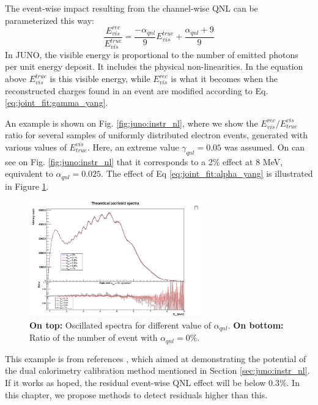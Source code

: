 \documentclass[../main.tex]{subfiles}
\begin{document}
The event-wise impact resulting from the channel-wise QNL can be parameterized this way:
\begin{equation}
  \label{eq:joint_fit:alpha_yang}
  \frac{E^{rec}_{vis}}{E^{true}_{vis}} = \frac{-\alpha_{qnl}}{9} E^{true}_{vis} + \frac{\alpha_{qnl} + 9}{9}
\end{equation}
In JUNO, the visible energy is proportional to the number of emitted photons per unit energy deposit. It includes the physical non-linearities.
In the equation above $E_{vis}^{true}$ is this visible energy, while $E_{vis}^{rec}$ is what it becomes when the reconstructed charges found in an event are modified according to Eq. \ref{eq:joint_fit:gamma_yang}.

An example is shown on Fig. \ref{fig:juno:instr_nl}, where we show the $E^{rec}_{vis}/E_{true}^{vis}$ ratio for several samples of uniformly distributed electron events, generated with various values of $E_{true}^{vis}$.
Here, an extreme value $\gamma_{qnl}=0.05$ was assumed. On can see on Fig. \ref{fig:juno:instr_nl} that it corresponds to a 2\% effect at 8 MeV, equivalent to $\alpha_{qnl} = 0.025$. The effect of Eq \ref{eq:joint_fit:alpha_yang} is illustrated in Figure \ref{fig:joint_fit:spectrums_comp}.

\begin{figure}[ht]
  \centering
  \includegraphics[height=5cm]{images/joint_fit/spectrums.png}
  \caption{\textbf{On top:} Oscillated spectra for different value of $\alpha_{qnl}$. \textbf{On bottom:} Ratio of the number of event with $\alpha_{qnl} = 0\%$.}
  \label{fig:joint_fit:spectrums_comp}
\end{figure}

This example is from references \cite{han_dual_2021}, which aimed at demonstrating the potential of the dual calorimetry calibration method mentioned in Section
\ref{sec:juno:instr_nl}. If it works as hoped, the residual event-wise QNL effect will be below 0.3\%. In this chapter, we propose methods to detect residuals higher than this.
\end{document}
